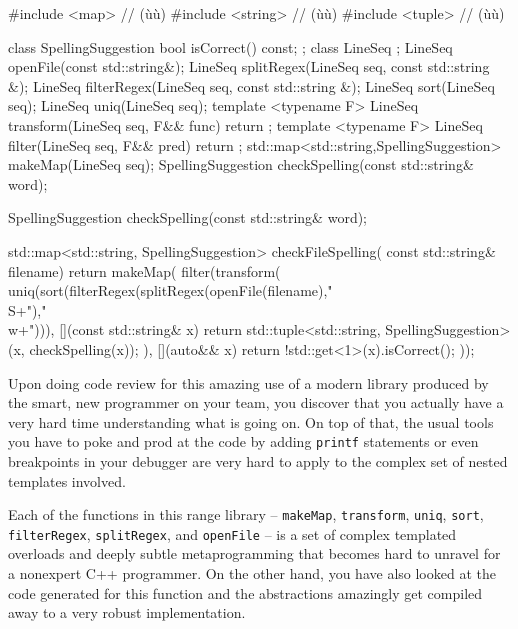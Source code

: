 \begin{emcppshiddenlisting}[emcppsbatch={e13,e14},emcppsstandards=c++14]
#include <map>     // (ù{}ù)
#include <string>  // (ù{}ù)
#include <tuple>   // (ù{}ù)

class SpellingSuggestion {
    bool isCorrect() const;
};
class LineSeq {};
LineSeq openFile(const std::string&);
LineSeq splitRegex(LineSeq seq, const std::string &);
LineSeq filterRegex(LineSeq seq, const std::string &);
LineSeq sort(LineSeq seq);
LineSeq uniq(LineSeq seq);
template <typename F>
LineSeq transform(LineSeq seq, F&& func) { return {}; }
template <typename F>
LineSeq filter(LineSeq seq, F&& pred) { return {}; }
std::map<std::string,SpellingSuggestion> makeMap(LineSeq seq);
SpellingSuggestion checkSpelling(const std::string& word);
\end{emcppshiddenlisting}
\begin{emcppslisting}[emcppsbatch=e13]
SpellingSuggestion checkSpelling(const std::string& word);

std::map<std::string, SpellingSuggestion> checkFileSpelling(
                                                   const std::string& filename)
{
    return makeMap(
        filter(transform(
           uniq(sort(filterRegex(splitRegex(openFile(filename),"\\S+"),"\\w+"))),
        [](const std::string& x)
        {
            return std::tuple<std::string, SpellingSuggestion>(x,
                                                             checkSpelling(x));
        }
   ), [](auto&& x) { return !std::get<1>(x).isCorrect(); }));
}
\end{emcppslisting}

\noindent Upon doing code review for this amazing use of a modern library produced
by the smart, new programmer on your team, you discover that you actually
have a very hard time understanding what is going on. On top of that,
the usual tools you have to poke and prod at the code by adding
\lstinline!printf! statements or even breakpoints in your debugger are very
hard to apply to the complex set of nested templates involved.

Each of the functions in this range library -- \lstinline!makeMap!,
\lstinline!transform!, \lstinline!uniq!, \lstinline!sort!, \lstinline!filterRegex!,
\lstinline!splitRegex!, and \lstinline!openFile! -- is a set of complex
templated overloads and deeply subtle metaprogramming that becomes hard
to unravel for a nonexpert C++ programmer. On the other hand, you have
also looked at the code generated for this function and the abstractions
amazingly get compiled away to a very robust implementation.

